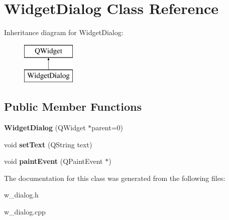 \hypertarget{class_widget_dialog}{}\section{Widget\+Dialog Class Reference}
\label{class_widget_dialog}
Inheritance diagram for Widget\+Dialog\+:\begin{figure}[H]
\begin{center}
\leavevmode
\includegraphics[height=2.000000cm]{class_widget_dialog}
\end{center}
\end{figure}
\subsection*{Public Member Functions}
\begin{DoxyCompactItemize}
\item 
\hypertarget{class_widget_dialog_aa282c5193c1318f92bd21fe77a3f66bb}{}{\bfseries Widget\+Dialog} (Q\+Widget $\ast$parent=0)\label{class_widget_dialog_aa282c5193c1318f92bd21fe77a3f66bb}

\item 
\hypertarget{class_widget_dialog_ac1733791b8c803fea604af7a724d5144}{}void {\bfseries set\+Text} (Q\+String text)\label{class_widget_dialog_ac1733791b8c803fea604af7a724d5144}

\item 
\hypertarget{class_widget_dialog_aa3af6ec9a3e6dc42e82f86a851994614}{}void {\bfseries paint\+Event} (Q\+Paint\+Event $\ast$)\label{class_widget_dialog_aa3af6ec9a3e6dc42e82f86a851994614}

\end{DoxyCompactItemize}


The documentation for this class was generated from the following files\+:\begin{DoxyCompactItemize}
\item 
w\+\_\+dialog.\+h\item 
w\+\_\+dialog.\+cpp\end{DoxyCompactItemize}
